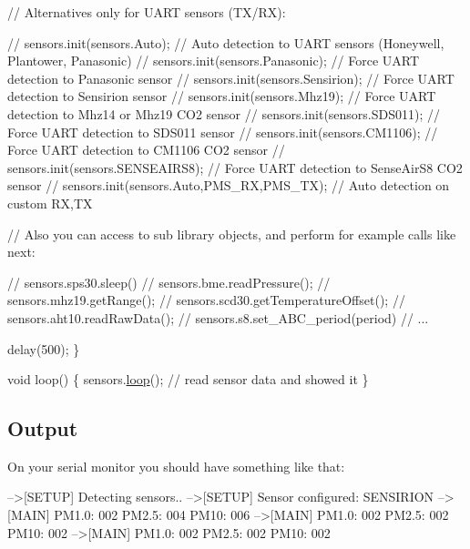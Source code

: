 \begin{DoxyCode}
    \textcolor{comment}{// Alternatives only for UART sensors (TX/RX):}

    \textcolor{comment}{// sensors.init(sensors.Auto);                  // Auto detection to UART sensors (Honeywell,
       Plantower, Panasonic)}
    \textcolor{comment}{// sensors.init(sensors.Panasonic);             // Force UART detection to Panasonic sensor}
    \textcolor{comment}{// sensors.init(sensors.Sensirion);             // Force UART detection to Sensirion sensor}
    \textcolor{comment}{// sensors.init(sensors.Mhz19);                 // Force UART detection to Mhz14 or Mhz19 CO2 sensor}
    \textcolor{comment}{// sensors.init(sensors.SDS011);                // Force UART detection to SDS011 sensor}
    \textcolor{comment}{// sensors.init(sensors.CM1106);                // Force UART detection to CM1106 CO2 sensor}
    \textcolor{comment}{// sensors.init(sensors.SENSEAIRS8);            // Force UART detection to SenseAirS8 CO2 sensor}
    \textcolor{comment}{// sensors.init(sensors.Auto,PMS\_RX,PMS\_TX);    // Auto detection on custom RX,TX}


    \textcolor{comment}{// Also you can access to sub library objects, and perform for example calls like next:}

    \textcolor{comment}{// sensors.sps30.sleep()}
    \textcolor{comment}{// sensors.bme.readPressure();}
    \textcolor{comment}{// sensors.mhz19.getRange();}
    \textcolor{comment}{// sensors.scd30.getTemperatureOffset();}
    \textcolor{comment}{// sensors.aht10.readRawData();}
    \textcolor{comment}{// sensors.s8.set\_ABC\_period(period)}
    \textcolor{comment}{// ...}

    delay(500);
\}

\textcolor{keywordtype}{void} loop() \{
    sensors.\hyperlink{classSensors_a255ece4e475221edb8ba7a8983014a76}{loop}();  \textcolor{comment}{// read sensor data and showed it}
\}
\end{DoxyCode}


\subsection*{Output}

On your serial monitor you should have something like that\+:


\begin{DoxyCode}
-->[SETUP] Detecting sensors..
-->[SETUP] Sensor configured: SENSIRION
-->[MAIN] PM1.0: 002 PM2.5: 004 PM10: 006
-->[MAIN] PM1.0: 002 PM2.5: 002 PM10: 002
-->[MAIN] PM1.0: 002 PM2.5: 002 PM10: 002
\end{DoxyCode}



